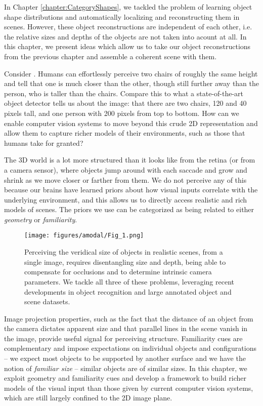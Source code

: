 In Chapter \ref{chapter:CategoryShapes}, we tackled the problem of learning object shape distributions and automatically localizing and  reconstructing them in scenes. However, these object reconstructions are independent of each other, i.e. the relative sizes and depths of the objects are not taken into acount at all. In this chapter, we present ideas which allow us to take our object reconstructions from the previous chapter and assemble a coherent scene with them.

Consider . Humans can effortlessly perceive two chairs of roughly the same height and tell that one is much closer than the other, though still further away than the person, who is taller than the chairs. Compare this to what a state-of-the-art object detector tells us about the image: that there are two chairs, 120 and 40 pixels tall, and one person with 200 pixels from top to bottom. How can we enable computer vision systems to move beyond this crude 2D representation and allow them to capture richer models of their environments, such as those that humans take for granted?

The 3D world is a lot more structured than it looks like from the retina (or from a camera sensor), where objects jump around with each saccade and grow and shrink as we move closer or farther from them. We do not perceive any of this because our brains have learned priors about how visual inputs correlate with the underlying environment, and this allows us to directly access realistic and rich models of scenes. The priors we use can be categorized as being related to either \textit{geometry} or \textit{familiarity}.

\begin{figure}[t!]
  \centering
  \texttt{[image: figures/amodal/Fig\_1.png]} %
  \caption{ Perceiving the veridical size of objects in realistic scenes, from a single image, requires disentangling size and depth, being able to compensate for occlusions and to determine intrinsic camera parameters. We tackle all three of these problems, leveraging recent developments in object recognition and large annotated object and scene datasets.}
\end{figure}

Image projection properties, such as the fact that the distance of an object from the camera dictates apparent size and that parallel lines in the scene vanish in the image, provide useful signal for perceiving structure. Familiarity cues are complementary and impose expectations on individual objects and configurations -- we expect most objects to be supported by another surface and we have the notion of \textit{familiar size} -- similar objects are of similar sizes. In this chapter, we exploit geometry and familiarity cues and develop a framework to build richer models of the visual input than those given by current computer vision systems, which are still largely confined to the 2D image plane.

